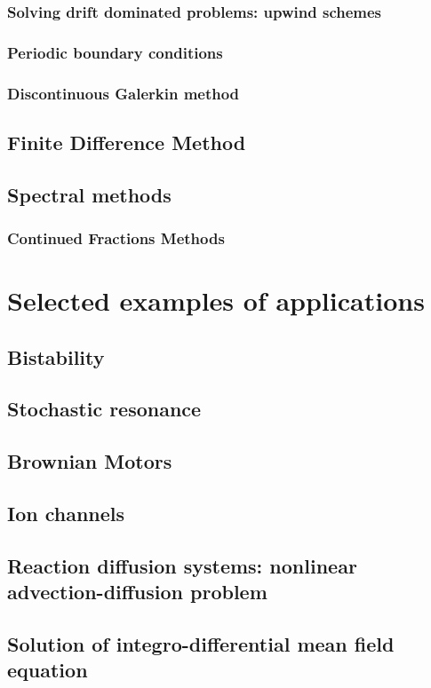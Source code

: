 \documentclass[authoryear,draft,1p,times]{elsarticle}
\renewcommand{\=}{\stackrel{\mathrm{d}}{=}}
\begin{document}
\subsubsection{Solving drift dominated problems: upwind schemes}
\subsubsection{Periodic boundary conditions}
\subsubsection{Discontinuous Galerkin method}
\subsection{Finite Difference Method}
\subsection{Spectral methods}
\subsubsection{Continued Fractions Methods}


\section{Selected  examples of applications }

\subsection{Bistability}
\subsection{Stochastic resonance}
\subsection{Brownian Motors}
\subsection{Ion channels}
\subsection{Reaction diffusion systems: nonlinear advection-diffusion problem}
\subsection{Solution of integro-differential mean field equation}
\end{document}
